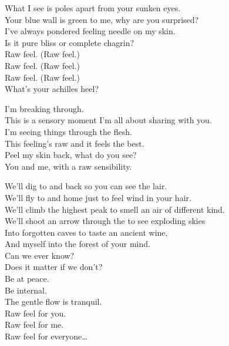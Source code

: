 
What I see is poles apart from your sunken eyes. \\
Your blue wall is green to me, why are you surprised? \\
I've always pondered feeling needle on my skin. \\
Is it pure bliss or complete chagrin? \\

Raw feel. (Raw feel.) \\
Raw feel. (Raw feel.) \\
Raw feel. (Raw feel.) \\
What's your achilles heel? \\


I'm breaking through. \\
This is a sensory moment I'm all about sharing with you. \\
I'm seeing things through the flesh. \\
This feeling's raw and it feels the best. \\
Peel my skin back, what do you see? \\
You and me, with a raw sensibility. \\


We'll dig to  and back so you can see the  lair. \\
We'll fly to  and home just to feel wind in your hair. \\
We'll climb the highest peak to smell an air of different kind. \\
We'll shoot an arrow through the  to see exploding skies \\
Into forgotten caves to taste an ancient wine, \\
And  myself into the forest of your mind. \\

Can we ever know? \\
Does it matter if we don't? \\
Be at peace. \\
Be internal. \\
The gentle flow is tranquil. \\

Raw feel for you. \\
Raw feel for me. \\
Raw feel for everyone… \\

